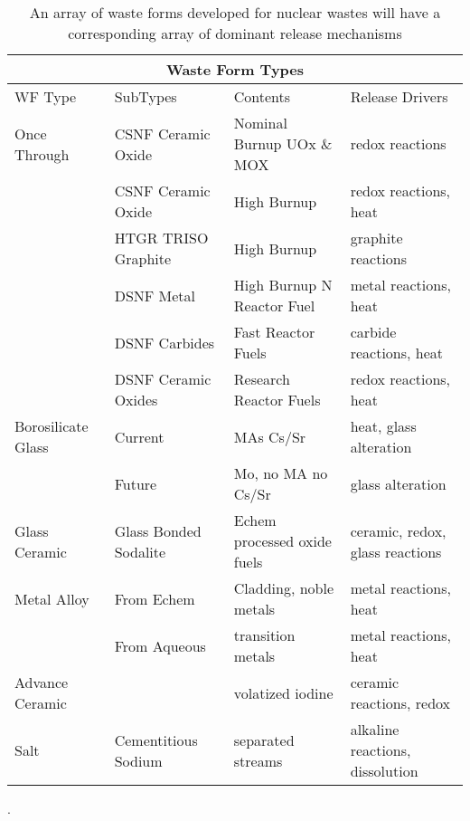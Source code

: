 %
\begin{table}[h!]
  \centering
  \footnotesize{
    \begin{tabularx}{\textwidth}{|l|X|X|X|}
    \multicolumn{4}{c}{\textbf{Waste Form Types}}\\
    \hline
    WF Type & SubTypes & Contents & Release Drivers  \\
    \hline
    \hline
    Once Through & \gls{CSNF} Ceramic Oxide & Nominal Burnup UOx \& MOX & redox reactions \\
                 & \gls{CSNF} Ceramic Oxide & High Burnup  & redox reactions, heat  \\
                 & \gls{HTGR} TRISO Graphite & High Burnup & graphite reactions\\
                 & \gls{DSNF} Metal  & High Burnup N Reactor Fuel & metal reactions,  heat\\
                 & \gls{DSNF} Carbides  & Fast Reactor Fuels & carbide reactions,  heat\\
                 & \gls{DSNF} Ceramic Oxides  & Research Reactor Fuels & redox reactions,  heat\\
    \hline
    Borosilicate Glass & Current & \glspl{MA} Cs/Sr & heat, glass alteration \\
                       & Future & Mo, no \gls{MA} no Cs/Sr & glass alteration  \\
    \hline
    Glass Ceramic & Glass Bonded Sodalite & Echem processed oxide fuels & ceramic, redox, glass reactions  \\
    \hline
    Metal Alloy & From Echem & Cladding, noble metals & metal reactions, heat \\
                & From Aqueous & transition metals & metal reactions, heat  \\
    \hline
    Advance Ceramic &  & volatized iodine  & ceramic reactions, redox \\
    \hline
    Salt  & Cementitious Sodium  & separated streams  & alkaline reactions, dissolution \\
    \hline
  \end{tabularx}
  \caption[Waste form types.]{An array of waste forms developed for nuclear 
  wastes will have a corresponding array of dominant release mechanisms \cite{blink_disposal_2010}}.
  \label{tab:wf}
  }
\end{table}


